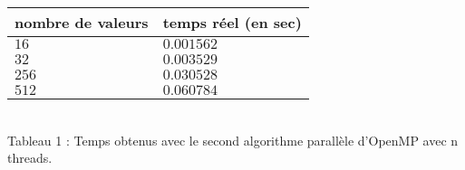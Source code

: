 \begin{center}
\begin{tabular}{ | l | l | }
    \hline
    nombre de valeurs   & temps réel (en sec) \\ \hline
    $16$                & $0.001562$ \\
    $32$                & $0.003529$ \\
    $256$               & $0.030528$ \\
    $512$               & $0.060784$ \\ \hline           
\end{tabular}\\
Tableau 1 : Temps obtenus avec le second algorithme parallèle d'OpenMP avec n threads.
\end{center}